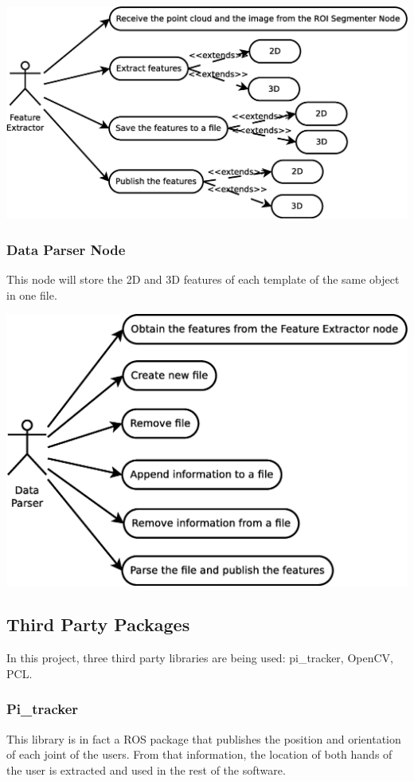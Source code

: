 \documentclass{article}
\begin{document}
\begin{center}
	\includegraphics[scale=0.4]{../diagrams/images/uc_feature_extractor.eps}
\end{center}


\subsubsection{Data Parser Node}
This node will store the 2D and 3D features of each template of the same object in one file. 
\begin{center}
	\includegraphics[scale=0.4]{../diagrams/images/uc_data_parser.eps}
\end{center}


\subsection{Third Party Packages}
\hspace{0.5cm}In this project, three third party libraries are being used: pi\_tracker, OpenCV, PCL. 
\subsubsection{ Pi\_tracker}
This library is in fact a ROS package that publishes the position and orientation of each joint of the users. From that information, the location of both hands of the user is extracted and used in the rest of the software. 
\end{document}
